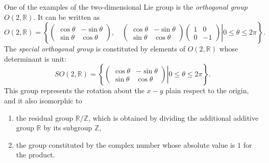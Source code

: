 \documentclass[a4paper,pdftex,10pt]{report}
\begin{document}
One of the examples of the two-dimensional Lie group is the \textit{orthogonal group} $O(2,\mathbb{R})$. It can be written as
\begin{equation}
  O(2,\mathbb{R})
  =
  \left\{
  \left.
  \begin{pmatrix}
    \cos\theta & -\sin\theta \\
    \sin\theta & \cos\theta
  \end{pmatrix}
  ,\quad
  \begin{pmatrix}
    \cos\theta & -\sin\theta \\
    \sin\theta & \cos\theta
  \end{pmatrix}
  \begin{pmatrix}
    1 & 0  \\
    0 & -1
  \end{pmatrix}
  \right|
  0\leq\theta\leq 2\pi
  \right\}
  .
\end{equation}
The \textit{special orthogonal group} is constituted by elements of $O(2,\mathbb{R})$ whose determinant is unit:
\begin{equation}
  SO(2,\mathbb{R})
  =
  \left\{
  \left.
  \begin{pmatrix}
    \cos\theta & -\sin\theta \\
    \sin\theta & \cos\theta
  \end{pmatrix}
  \right|
  0\leq\theta\leq 2\pi
  \right\}
  .
\end{equation}
This group represents the rotation about the $x-y$ plain respect to the origin, and it also isomorphic to 
\begin{enumerate}
  \item
        the residual group $\mathbb{R}/\mathbb{Z}$, which is obtained by dividing the additional additive group $\mathbb{R}$ by its subgroup $\mathbb{Z}$,
  \item
        the group constituted by the complex number whose absolute value is $1$ for the product.
\end{enumerate}




















\clearpage



\nocite{Humphreys:1972}

\end{document}
